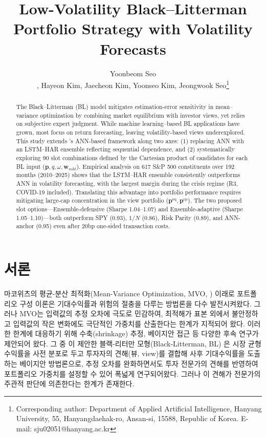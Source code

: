 \documentclass[eng]{kjas3}
\begin{document}
\title{Low-Volatility Black--Litterman Portfolio Strategy with Volatility Forecasts}

\author{
Yoonbeom Seo\address[a]{Team Sparta;},
Hayeon Kim\same[a],
Jaecheon Kim\same[a],
Yoonseo Kim\same[a],
Jeongwook Seo\footnote{Corresponding author:
Department of Applied Artificial Intelligence, Hanyang University,
55, Hanyangdaehak-ro, Ansan-si, 15588, Republic of Korea.
E-mail: sju02051@hanyang.ac.kr}\address[b]{Department of Applied Artificial Intelligence, Hanyang University}
}

\begin{abstract}
The Black--Litterman (BL) model mitigates estimation-error sensitivity in mean--variance optimization by combining market equilibrium with investor views, yet relies on subjective expert judgment. While machine learning--based BL applications have grown, most focus on return forecasting, leaving volatility-based views underexplored. This study extends \citet{pyo2018}'s ANN-based framework along two axes: (1) replacing ANN with an LSTM--HAR ensemble reflecting sequential dependence, and (2) systematically exploring 90 slot combinations defined by the Cartesian product of candidates for each BL input ($\mathbf{p}, q, \omega, \mathbf{w}_{mkt}$). Empirical analysis on 617 S\&P 500 constituents over 192 months (2010--2025) shows that the LSTM--HAR ensemble consistently outperforms ANN in volatility forecasting, with the largest margin during the crisis regime (R3, COVID-19 included). Translating this advantage into portfolio performance requires mitigating large-cap concentration in the view portfolio ($\mathbf{p}^{\mathrm{eq}}, \mathbf{p}^{\mathrm{rp}}$). The two proposed slot options---Ensemble-defensive (Sharpe 1.04--1.07) and Ensemble-adaptive (Sharpe 1.05--1.10)---both outperform SPY (0.93), $1/N$ (0.86), Risk Parity (0.89), and ANN-anchor (0.95) even after 20bp one-sided transaction costs.
\end{abstract}


\section{서론}

마코위츠의 평균-분산 최적화(Mean-Variance Optimization, MVO, \citealp{markowitz1952}) 이래로 포트폴리오 구성 이론은 기대수익률과 위험의 절충을 다루는 방법론을 다수 발전시켜왔다. 그러나 MVO는 입력값의 추정 오차에 극도로 민감하여, 최적해가 표본 외에서 불안정하고 입력값의 작은 변화에도 극단적인 가중치를 산출한다는 한계가 지적되어 왔다. 이러한 한계에 대응하기 위해 수축(shrinkage) 추정\citep{ledoitwolf2004}, 베이지안 접근 등 다양한 후속 연구가 제안되어 왔다. 그 중 \citet{black1992}이 제안한 블랙-리터만 모형(Black-Litterman, BL) 은 시장 균형 수익률을 사전 분포로 두고 투자자의 견해(뷰, view)를 결합해 사후 기대수익률을 도출하는 베이지안 방법론으로, 추정 오차를 완화하면서도 투자 전문가의 견해를 반영하여 포트폴리오 가중치를 설정할 수 있어 폭넓게 연구되어왔다. 그러나 이 견해가 전문가의 주관적 판단에 의존한다는 한계가 존재한다.
\end{document}
